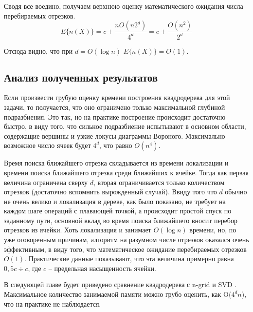 Сводя все воедино, получаем верхнюю оценку математического ожидания числа перебираемых отрезков.
\begin{equation}
E\{n(X)\} = c + \frac{nO(n2^d)}{4^d} = c + \frac{O(n^2)}{2^d}
\end{equation}

Отсюда видно, что при $d = O(\log n)$ $E\{n(X)\} = O(1)$.

\FloatBarrier
\subsection{Анализ полученных результатов}
Если произвести грубую оценку времени построения квадродерева для
этой задачи, то получается, что оно ограничено только максимальной глубиной
подразбиения. Это так, но на практике построение происходит достаточно
быстро, в виду того, что сильное подразбиение испытывают в основном
области, содержащие вершины и узкие локусы диаграммы Вороного. 
Максимально возможное число ячеек будет $4^d$, что равно $O(n^4)$.

Время поиска ближайшего отрезка складывается из времени
локализации и времени поиска ближайшего отрезка среди ближайших к
ячейке. Тогда как первая величина ограничена сверху $d$, вторая ограничивается
только количеством отрезков (достаточно вспомнить вырожденный случай).
Ввиду того что $d$ обычно не очень велико и локализация в дереве, как
было показано, не требует на каждом шаге операций с плавающей точкой, 
а происходит простой спуск по заданному пути, основной вклад во время 
поиска ближайшего вносит перебор отрезков из ячейки.
Хоть локализация и занимает $O(\log n)$ времени, но, по уже оговоренным причинам,
алгоритм на разумном числе отрезков оказался очень эффективным, в виду того,
что математическое ожидание перебираемых отрезков $O(1)$. Практические данные
показывают, что эта величина примерно равна $0,5c ÷ c$, где $c$ -- предельная
насыщенность ячейки. 

В следующей главе будет приведено сравнение
квадродерева с n-grid \cite{NGRID} и SVD \cite{CGAL}.
Максимальное количество занимаемой памяти можно грубо оценить, как
O($4^{d}n$), что на практике не наблюдается.

\FloatBarrier
